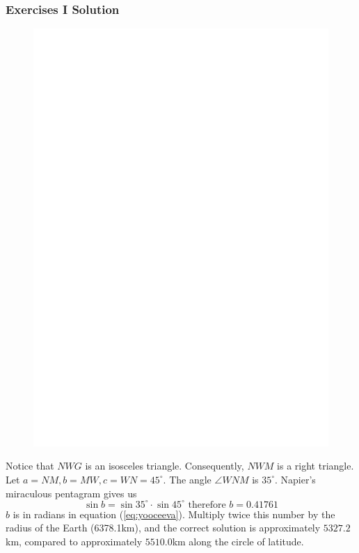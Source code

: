 \documentclass[xcolor=dvipsnames]{beamer}
\begin{document}
\begin{frame}
  \frametitle{Exercises I Solution}
\begin{figure}[h]
\includegraphics[scale=.3]{./WindsorGrenoble1.eps}
\end{figure}

Notice that $NWG$ is an isosceles triangle. Consequently, $NWM$ is a
right triangle. Let $a=NM,b=MW,c=WN=45^{\circ}$. The angle
$\angle{}WNM$ is $35^{\circ}$. Napier's miraculous pentagram gives us
\begin{equation}
  \label{eq:yooceeva}
  \sin{}b=\sin{}35^{\circ}\cdot\sin{}45^{\circ}\mbox{ therefore }b=0.41761
\end{equation}
$b$ is in radians in equation (\ref{eq:yooceeva}). Multiply twice this
number by the radius of the Earth (6378.1km), and the correct solution
is approximately $5327.2$km, compared to approximately $5510.0$km
along the circle of latitude.
\end{frame}
\end{document}
